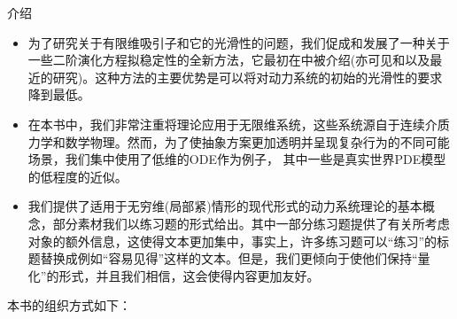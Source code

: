 \begin{PreChapter}{介\quad 绍}
\begin{itemize}
		\item 为了研究关于有限维吸引子和它的光滑性的问题，我们促成和发展了一种关于一些二阶演化方程拟稳定性的全新方法，它最初在\cite{Chueshov04}中被介绍(亦可见\cite{Chueshov08}和\cite{Chueshov10}以及最近的研究\cite{Chueshov13})。这种方法的主要优势是可以将对动力系统的初始的光滑性的要求降到最低。
		
		\item 在本书中，我们非常注重将理论应用于无限维系统，这些系统源自于连续介质力学和数学物理。然而，为了使抽象方案更加透明并呈现复杂行为的不同可能场景，我们集中使用了低维的ODE作为例子， 其中一些是真实世界PDE模型的低程度的近似。
		
		\item 我们提供了适用于无穷维(局部紧)情形的现代形式的动力系统理论的基本概念，部分素材我们以练习题的形式给出。其中一部分练习题提供了有关所考虑对象的额外信息，这使得文本更加集中，事实上，许多练习题可以“练习”的标题替换成例如“容易见得”这样的文本。但是，我们更倾向于使他们保持“量化”的形式，并且我们相信，这会使得内容更加友好。
	\end{itemize}

	本书的组织方式如下：

\end{PreChapter}